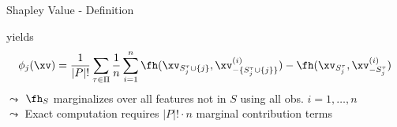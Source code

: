 \documentclass[10pt,compress,t,notes=noshow, xcolor=table]{beamer}
\newcommand{\Sm}{S_m}%
\newcommand{\Smj}{\Sm \cup \{j\}}
\newcommand{\Stau}{S_{j}^\tau}%
\newcommand{\Stauj}{\Stau \cup \{j\}}
\newcommand{\minusStauj}{- \{\Stau \cup \{j\} \} }
\begin{document}
\begin{framev}[align=top]{Shapley Value - Definition  }
\begin{itemizeM}
yields
$$
\phi_j(\xv) = \frac{1}{|P|!} \sum_{\tau \in \Pi} \frac{1}{n} \sum_{i = 1}^n
\fh(\xv_{\Stauj}, \xv_{\minusStauj}^{(i)}) - \fh(\xv_{\Stau}, \xv_{-\Stau}^{(i)})
$$
$\leadsto$ $\fh_S$ marginalizes over all features not in $S$ using all obs. $i = 1, \ldots, n$\\
$\leadsto$ Exact computation requires $|P|! \cdot n$ marginal contribution terms
\end{itemizeM}
\spacer[0.25]
\end{framev}


\end{document}
